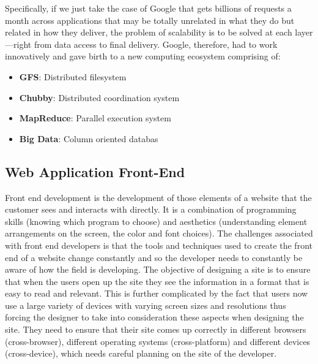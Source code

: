 Specifically, if we just take the case of Google that gets billions of requests a month
across applications that may be totally unrelated in what they do but related in how
they deliver, the problem of scalability is to be solved at each layer—right from data
access to final delivery. Google, therefore, had to work innovatively and gave birth
to a new computing ecosystem comprising of:
\begin{itemize}
  \item \textbf{GFS}: Distributed filesystem
  \item \textbf{Chubby}: Distributed coordination system
  \item \textbf{MapReduce}: Parallel execution system
  \item \textbf{Big Data}: Column oriented databas
\end{itemize}
\subsection{Web Application Front-End} 
Front end development is the development of those elements of a website that the customer sees and interacts with directly. It is a combination of programming skills (knowing which program to choose) and aesthetics (understanding element arrangements on the screen, the color and font choices). The challenges associated with front end developers is that the tools and techniques used to create the front end of a website change constantly and so the developer needs to constantly be aware of how the field is developing.
The objective of designing a site is to ensure that when the users open up the site they see the information in a format that is easy to read and relevant. This is further complicated by the fact that users now use a large variety of devices with varying screen sizes and resolutions thus forcing the designer to take into consideration these aspects when designing the site. They need to ensure that their site comes up correctly in different browsers (cross-browser), different operating systems (cross-platform) and different devices (cross-device), which needs careful planning on the site of the developer.\cite{16}
